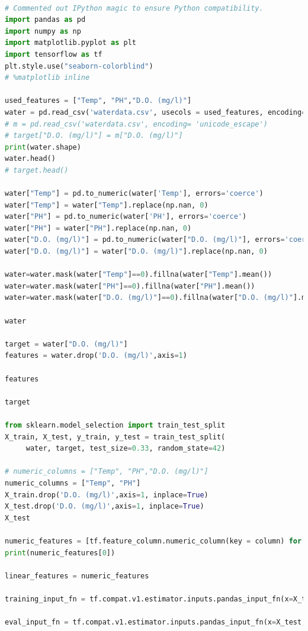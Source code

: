 \begin{lstlisting}[language=python, caption={Linear regression Model Tensorflow API}]

# Commented out IPython magic to ensure Python compatibility.
import pandas as pd
import numpy as np
import matplotlib.pyplot as plt
import tensorflow as tf
plt.style.use("seaborn-colorblind")
# %matplotlib inline

used_features = ["Temp", "PH","D.O. (mg/l)"]
water = pd.read_csv('waterdata.csv', usecols = used_features, encoding= 'unicode_escape')
# m = pd.read_csv('waterdata.csv', encoding= 'unicode_escape')
# target["D.O. (mg/l)"] = m["D.O. (mg/l)"]
print(water.shape)
water.head()
# target.head()

water["Temp"] = pd.to_numeric(water['Temp'], errors='coerce')
water["Temp"] = water["Temp"].replace(np.nan, 0)
water["PH"] = pd.to_numeric(water['PH'], errors='coerce')
water["PH"] = water["PH"].replace(np.nan, 0)
water["D.O. (mg/l)"] = pd.to_numeric(water["D.O. (mg/l)"], errors='coerce')
water["D.O. (mg/l)"] = water["D.O. (mg/l)"].replace(np.nan, 0)

water=water.mask(water["Temp"]==0).fillna(water["Temp"].mean())
water=water.mask(water["PH"]==0).fillna(water["PH"].mean())
water=water.mask(water["D.O. (mg/l)"]==0).fillna(water["D.O. (mg/l)"].mean())

water

target = water["D.O. (mg/l)"]
features = water.drop('D.O. (mg/l)',axis=1)

features

target

from sklearn.model_selection import train_test_split
X_train, X_test, y_train, y_test = train_test_split(
     water, target, test_size=0.33, random_state=42)

# numeric_columns = ["Temp", "PH","D.O. (mg/l)"]
numeric_columns = ["Temp", "PH"]
X_train.drop('D.O. (mg/l)',axis=1, inplace=True)
X_test.drop('D.O. (mg/l)',axis=1, inplace=True)
X_test

numeric_features = [tf.feature_column.numeric_column(key = column) for column in numeric_columns]
print(numeric_features[0])

linear_features = numeric_features

training_input_fn = tf.compat.v1.estimator.inputs.pandas_input_fn(x=X_train, y=y_train, batch_size=32, shuffle=True, num_epochs=None)

eval_input_fn = tf.compat.v1.estimator.inputs.pandas_input_fn(x=X_test, y=y_test, batch_size=32, shuffle=False, num_epochs = 1)


\end{lstlisting}

